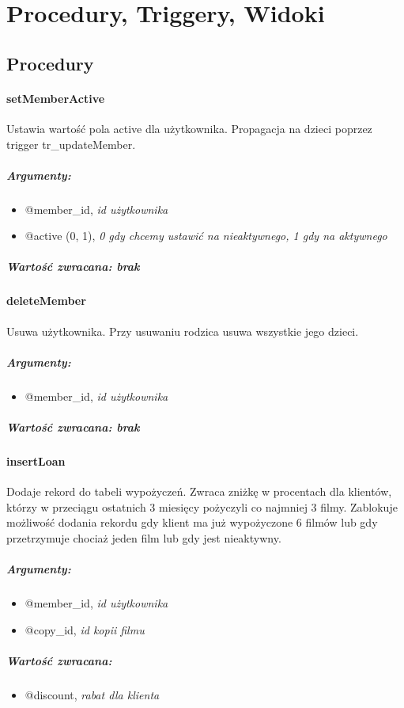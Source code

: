 \documentclass[12pt,a4paper,titlepage]{article}
\begin{document}

\newpage
\section{Procedury, Triggery, Widoki}



\subsection{Procedury}
\paragraph{setMemberActive}
Ustawia wartość pola active dla użytkownika. Propagacja na dzieci poprzez trigger tr\_updateMember.
\subparagraph{Argumenty:}
\begin{itemize}
	\item @member\_id, \textit{id użytkownika}
	\item @active (0, 1), \textit{0 gdy chcemy ustawić na nieaktywnego, 1 gdy na aktywnego}
\end{itemize}
\subparagraph{Wartość zwracana: brak}

\paragraph{deleteMember}
Usuwa użytkownika. Przy usuwaniu rodzica usuwa wszystkie jego dzieci.
\subparagraph{Argumenty:}
\begin{itemize}
	\item @member\_id, \textit{id użytkownika}
\end{itemize}
\subparagraph{Wartość zwracana: brak}

\paragraph{insertLoan}
Dodaje rekord do tabeli wypożyczeń. Zwraca zniżkę w procentach dla klientów, którzy w przeciągu ostatnich 3 miesięcy pożyczyli co najmniej 3 filmy.
Zablokuje możliwość dodania rekordu gdy klient ma już wypożyczone 6 filmów lub gdy przetrzymuje chociaż jeden film lub gdy jest nieaktywny.
\subparagraph{Argumenty:}
\begin{itemize}
	\item @member\_id, \textit{id użytkownika}
	\item @copy\_id, \textit{id kopii filmu}
\end{itemize}
\subparagraph{Wartość zwracana:}
\begin{itemize}
	\item @discount, \textit{rabat dla klienta}
\end{itemize}
\end{document}
